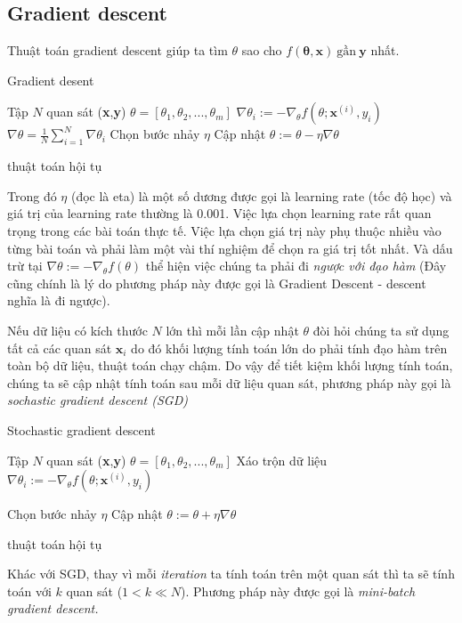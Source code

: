 \subsection{Gradient descent}
Thuật toán gradient descent \cite{mlcb} giúp ta tìm $\theta$ sao cho $f(\mathbf{\theta},\textbf{x})~\text{gần}~\textbf{y}$ nhất.
\begin{algorithm}[H]
\label{alg:grad}
\caption{Gradient desent}
\begin{algorithmic}[1]
\REQUIRE Tập $N$ quan sát (\textbf{x},\textbf{y})
\REQUIRE $\theta=[\theta_1,\theta_2,...,\theta_m]$
\REPEAT 
{}
\STATE $\nabla \theta_i := - \nabla_{\theta}f(\theta;\textbf{x}^{(i)},y_i)$
\ENDFOR
\STATE $\nabla \theta  =\frac{1}{N} \sum^{N}_{i=1}\nabla\theta_i$
\STATE Chọn bước nhảy $\eta$
\STATE Cập nhật $\theta := \theta - \eta\nabla\theta$

\UNTIL	thuật toán hội tụ
\end{algorithmic}
\end{algorithm}
Trong đó $\eta$ (đọc là eta) là một số dương được gọi là learning rate (tốc độ học) và giá trị của learning rate thường là 0.001. Việc lựa chọn learning rate rất quan trọng trong các bài toán thực tế. Việc lựa chọn giá trị này phụ thuộc nhiều vào từng bài toán và phải làm một vài thí nghiệm để chọn ra giá trị tốt nhất. Và dấu trừ tại $\nabla \theta := - \nabla_{\theta}f(\theta)$ thể hiện việc chúng ta phải đi\textit{ ngược với đạo hàm} (Đây cũng chính là lý do phương pháp này được gọi là Gradient Descent - descent nghĩa là đi ngược).\par
Nếu dữ liệu có kích thước $N$ lớn thì mỗi lần cập nhật $\theta$ đòi hỏi chúng ta sử dụng tất cả các quan sát $\textbf{x}_i$ do đó khối lượng tính toán lớn do phải tính đạo hàm trên toàn bộ dữ liệu, thuật toán chạy chậm. Do vậy để tiết kiệm khối lượng tính toán, chúng ta sẽ cập nhật tính toán sau mỗi dữ liệu quan sát, phương pháp này gọi là \textit{sochastic gradient descent (SGD)}

\begin{algorithm}[H]
\label{alg:sgd}
\caption{Stochastic gradient descent}
\begin{algorithmic}[1]
\REQUIRE Tập $N$ quan sát (\textbf{x},\textbf{y})
\REQUIRE  $\theta=[\theta_1,\theta_2,...,\theta_m]$
\REPEAT 
\STATE Xáo trộn dữ liệu
\STATE $\nabla \theta_i := - \nabla_{\theta}f(\theta;\textbf{x}^{(i)},y_i)$

\STATE Chọn bước nhảy $\eta$
\STATE Cập nhật $\theta := \theta + \eta\nabla\theta$
	\STATE {}
\ENDIF
\ENDFOR

\UNTIL	thuật toán hội tụ
\end{algorithmic}
\end{algorithm}
Khác với SGD, thay vì mỗi \textit{iteration} ta tính toán trên một quan sát thì ta sẽ tính toán với $k$ quan sát ($1<k\ll N$). Phương pháp này được gọi là \textit{mini-batch gradient descent.}

